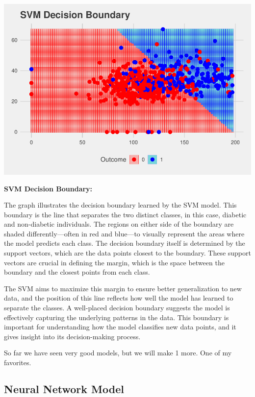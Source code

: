 \documentclass[
]{article}
\begin{document}
\begin{center}\includegraphics{Diabetes-Project_files/figure-latex/svm-1} \end{center}

\textbf{SVM Decision Boundary:}

The graph illustrates the decision boundary learned by the SVM model.
This boundary is the line that separates the two distinct classes, in
this case, diabetic and non-diabetic individuals. The regions on either
side of the boundary are shaded differently---often in red and blue---to
visually represent the areas where the model predicts each class. The
decision boundary itself is determined by the support vectors, which are
the data points closest to the boundary. These support vectors are
crucial in defining the margin, which is the space between the boundary
and the closest points from each class.

The SVM aims to maximize this margin to ensure better generalization to
new data, and the position of this line reflects how well the model has
learned to separate the classes. A well-placed decision boundary
suggests the model is effectively capturing the underlying patterns in
the data. This boundary is important for understanding how the model
classifies new data points, and it gives insight into its
decision-making process.

So far we have seen very good models, but we will make 1 more. One of my
favorites.

\newpage

\subsection{Neural Network Model}\label{neural-network-model}
\end{document}
